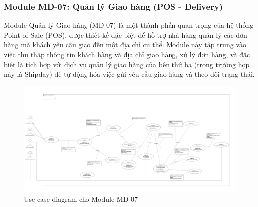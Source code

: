 \subsubsection{Module MD-07: Quản lý Giao hàng (POS - Delivery)}
Module Quản lý Giao hàng (MD-07) là một thành phần quan trọng của hệ thống Point of Sale (POS), được thiết kế đặc biệt để hỗ trợ nhà hàng quản lý các đơn hàng mà khách yêu cầu giao đến một địa chỉ cụ thể. Module này tập trung vào việc thu thập thông tin khách hàng và địa chỉ giao hàng, xử lý đơn hàng, và đặc biệt là tích hợp với dịch vụ quản lý giao hàng của bên thứ ba (trong trường hợp này là Shipday) để tự động hóa việc gửi yêu cầu giao hàng và theo dõi trạng thái.



\begin{figure}[H]
    \centering
    \includegraphics[width=15cm]{Sections/tong_quan/functional_spec/img/uc7.png}
    \vspace{0.5cm}
    \caption{Use case diagram cho Module MD-07}
    \label{fig:my_label}
\end{figure}

